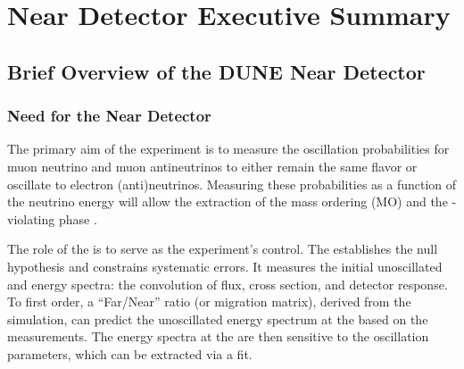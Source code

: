 \chapter{Near Detector Executive Summary}
\label{ch:exsum-nd}


\section{Brief Overview of the DUNE Near Detector}
\label{sec:exsum-nd-overview}


\subsection{Need for the Near Detector}
\label{sec:BriefOverview-need}

The primary aim of the  experiment is to measure the oscillation probabilities for muon neutrino and muon antineutrinos to either remain the same flavor or oscillate to electron (anti)neutrinos. Measuring these probabilities as a function of the neutrino energy will allow the extraction of the mass ordering (MO) and the -violating phase \deltacp.

The role of the  is to serve as the experiment's control. The  establishes the null hypothesis and constrains systematic errors. It measures the initial unoscillated \numu and \nue energy spectra: the convolution of flux, cross section, and detector response. To first order, a ``Far/Near'' ratio (or migration matrix), derived from the simulation, can predict the unoscillated energy spectrum at the  based on the  measurements.  The energy spectra at the  are then sensitive to the oscillation parameters, which can be extracted via a fit.

